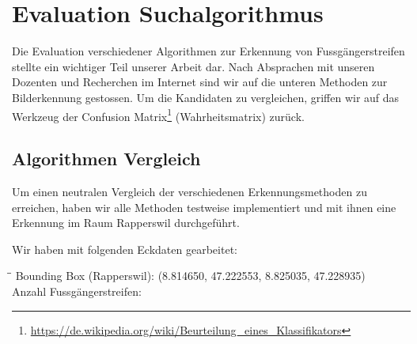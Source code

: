 \section{Evaluation Suchalgorithmus}
\label{sec:suchalgorithmus}
Die Evaluation verschiedener Algorithmen zur Erkennung von Fussgängerstreifen stellte ein wichtiger Teil unserer Arbeit dar. Nach Absprachen mit unseren Dozenten und Recherchen im Internet sind wir auf die unteren Methoden zur Bilderkennung gestossen. Um die Kandidaten zu vergleichen, griffen wir auf das Werkzeug der Confusion Matrix\footnote{\url{https://de.wikipedia.org/wiki/Beurteilung_eines_Klassifikators}} (Wahrheitsmatrix) zurück.

\subsection{Algorithmen Vergleich}
Um einen neutralen Vergleich der verschiedenen Erkennungsmethoden zu erreichen, haben wir alle Methoden testweise implementiert und mit ihnen eine Erkennung im Raum Rapperswil durchgeführt.

Wir haben mit folgenden Eckdaten gearbeitet:
\begin{tabbing}[H]
    \hspace*{5cm}\=\hspace*{6cm}\= \kill
    Bounding Box (Rapperswil): \> (8.814650, 47.222553, 8.825035, 47.228935) \\
    Anzahl Fussgängerstreifen:  \\
\end{tabbing}


